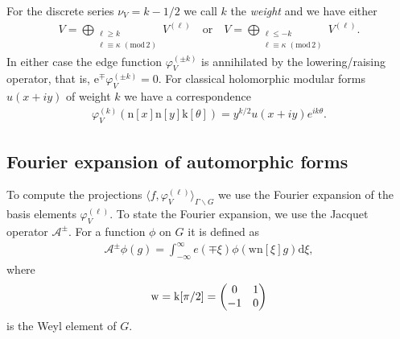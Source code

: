 \documentclass[12pt]{amsart}
\theoremstyle{definition}
\theoremstyle{remark}
\numberwithin{equation}{section}
\newcommand{\1}{{\mathbf 1}}
\newcommand{\n}{\mathrm{n}}
\renewcommand{\k}{\mathrm{k}}
\renewcommand{\d}{\mathrm d}
\renewcommand{\n}{\mathrm{n}}
\newcommand{\w}{\mathrm w}
\renewcommand{\pmod}[1]{\,\,(\mathrm{mod}\,{#1})}
\begin{document}
For the discrete series $\nu_V = k-1/2$ we call $k$ the \emph{weight} and we have either
\begin{align*}
    V = \bigoplus_{\substack{\ell  \geq k\\ \ell \equiv \kappa\pmod{2}}} V^{(\ell)} \quad \text{or} \quad   V= \bigoplus_{\substack{\ell  \leq - k\\  \ell \equiv \kappa\pmod{2}}} V^{(\ell)}.
\end{align*}
In either case the edge function $\varphi_V^{(\pm k)}$ is annihilated by the lowering/raising operator, that is, $\mathrm{e}^{\mp} \varphi_V^{(\pm k)} = 0$. For classical holomorphic modular forms $u(x+iy)$ of weight $k$ we have a correspondence
\begin{align*}
    \varphi_V^{(k)}(\n[x] \n[y] \k[\theta]) = y^{k/2} u(x+iy) e^{i k \theta}.
\end{align*}




\subsection{Fourier expansion of automorphic forms}

To compute the projections $\langle f ,\varphi_V^{(\ell)} \rangle_{\Gamma \backslash G}$ we use the Fourier expansion of the basis elements $\varphi_V^{(\ell)}$.  To state the Fourier expansion, we use the Jacquet operator $\mathcal{A}^{\pm}$. For a function $\phi$ on $G$ it is defined as
\begin{align*}
    \mathcal{A}^\pm \phi(g)=\int_{-\infty}^\infty e(\mp \xi) \phi( \w \n[\xi] g) \d \xi,
\end{align*}
where 
\begin{align*}
    \w=\k[\pi/2]=\mqty(0 & 1 \\ -1 & 0) 
\end{align*}
is the Weyl element of $G$. 
\end{document}

